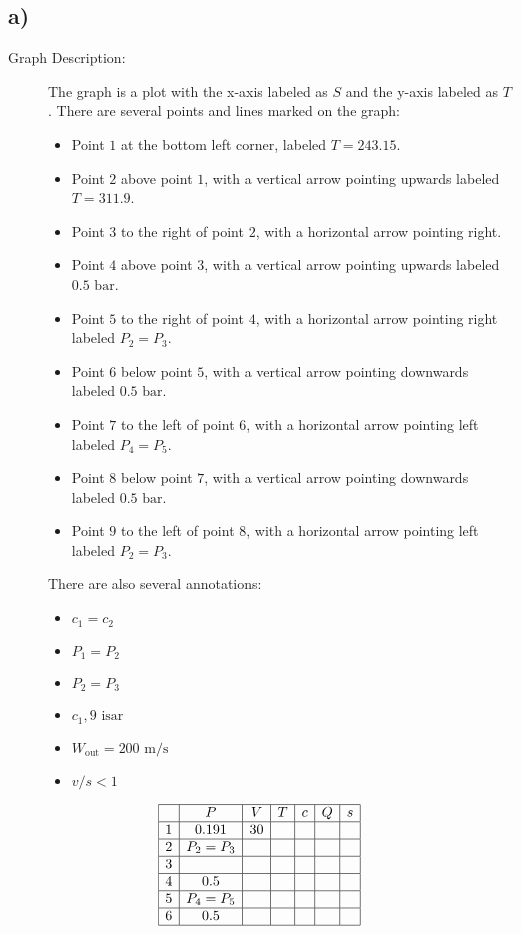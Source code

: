 

\subsection*{a)}

\begin{description}
    \item[Graph Description:] The graph is a plot with the x-axis labeled as $S$ and the y-axis labeled as $T$. There are several points and lines marked on the graph:
    \begin{itemize}
        \item Point $1$ at the bottom left corner, labeled $T=243.15$.
        \item Point $2$ above point $1$, with a vertical arrow pointing upwards labeled $T=311.9$.
        \item Point $3$ to the right of point $2$, with a horizontal arrow pointing right.
        \item Point $4$ above point $3$, with a vertical arrow pointing upwards labeled $0.5 \text{ bar}$.
        \item Point $5$ to the right of point $4$, with a horizontal arrow pointing right labeled $P_2 = P_3$.
        \item Point $6$ below point $5$, with a vertical arrow pointing downwards labeled $0.5 \text{ bar}$.
        \item Point $7$ to the left of point $6$, with a horizontal arrow pointing left labeled $P_4 = P_5$.
        \item Point $8$ below point $7$, with a vertical arrow pointing downwards labeled $0.5 \text{ bar}$.
        \item Point $9$ to the left of point $8$, with a horizontal arrow pointing left labeled $P_2 = P_3$.
    \end{itemize}
    There are also several annotations:
    \begin{itemize}
        \item $c_1 = c_2$
        \item $P_1 = P_2$
        \item $P_2 = P_3$
        \item $c_1, 9 \text{ isar}$
        \item $W_{\text{out}} = 200 \text{ m/s}$
        \item $v/s < 1$
    \end{itemize}
\end{description}

\[
\begin{array}{|c|c|c|c|c|c|c|}
\hline
 & P & V & T & c & Q & s \\
\hline
1 & 0.191 & 30 & & & & \\
\hline
2 & P_2 = P_3 & & & & & \\
\hline
3 & & & & & & \\
\hline
4 & 0.5 & & & & & \\
\hline
5 & P_4 = P_5 & & & & & \\
\hline
6 & 0.5 & & & & & \\
\hline
\end{array}
\]